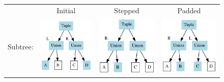 \documentclass[a4paper,english]{lipics-v2019}
\begin{document}
\begin{figure}
\centering
\begin{tabularx}{\linewidth}{c|ccc}
& Initial & Stepped & Padded\\
Subtree: &
\includegraphics[scale=0.50]{figures-gen/transex1.pdf} & 
\includegraphics[scale=0.50]{figures-gen/transex2.pdf} & 
\includegraphics[scale=0.50]{figures-gen/transex3.pdf} \\

\end{tabularx}
\end{figure}
\end{document}
